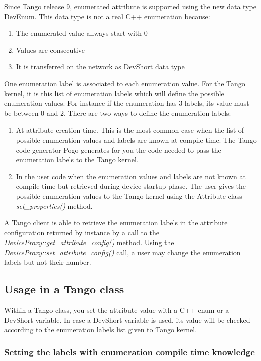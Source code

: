 Since Tango release 9, enumerated attribute is supported using the
new data type DevEnum. This data type is not a real
C++ enumeration because:
\begin{enumerate}
\item The enumerated value allways start with 0
\item Values are consecutive
\item It is transferred on the network as DevShort data type
\end{enumerate}
One enumeration label is associated to each enumeration value. For
the Tango kernel, it is this list of enumeration labels which will
define the possible enumeration values. For instance if the enumeration
has 3 labels, its value must be between 0 and 2. There are two ways
to define the enumeration labels:
\begin{enumerate}
\item At attribute creation time. This is the most common case when the
list of possible enumeration values and labels are known at compile
time. The Tango code generator Pogo generates for you the code needed
to pass the enumeration labels to the Tango kernel.
\item In the user code when the enumeration values and labels are not known
at compile time but retrieved during device startup phase. The user
gives the possible enumeration values to the Tango kernel using the
Attribute class \emph{set\_properties()} method.
\end{enumerate}
A Tango client is able to retrieve the enumeration labels in the attribute
configuration returned by instance by a call to the \emph{DeviceProxy::get\_attribute\_config()}
method. Using the \emph{DeviceProxy::set\_attribute\_config()} call,
a user may change the enumeration labels but not their number.

\subsection{Usage in a Tango class}

Within a Tango class, you set the attribute value with a C++ enum
or a DevShort variable. In case a DevShort variable is used, its value
will be checked according to the enumeration labels list given to
Tango kernel.

\subsubsection{Setting the labels with enumeration compile time knowledge}


